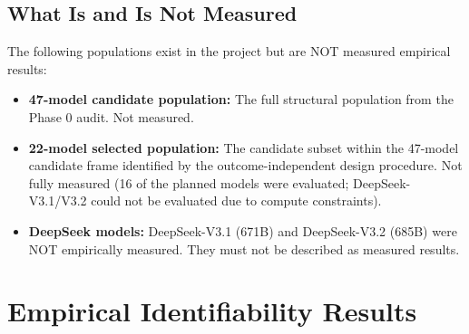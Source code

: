 \documentclass{ieeeaccess}
\theoremstyle{definition}
\theoremstyle{plain}
\begin{document}
\subsection{What Is and Is Not Measured}
The following populations exist in the project but are NOT measured empirical results:
\begin{itemize}
\item \textbf{47-model candidate population:} The full structural population from the Phase 0 audit. Not measured.
\item \textbf{22-model selected population:} The candidate subset within the 47-model candidate frame identified by the outcome-independent design procedure. Not fully measured (16 of the planned models were evaluated; DeepSeek-V3.1/V3.2 could not be evaluated due to compute constraints).
\item \textbf{DeepSeek models:} DeepSeek-V3.1 \mbox{(671B)} and DeepSeek-V3.2 \mbox{(685B)} were NOT empirically measured. They must not be described as measured results.
\end{itemize}

\FloatBarrier

\section{Empirical Identifiability Results}
\label{sec:empirical_results}
\end{document}

